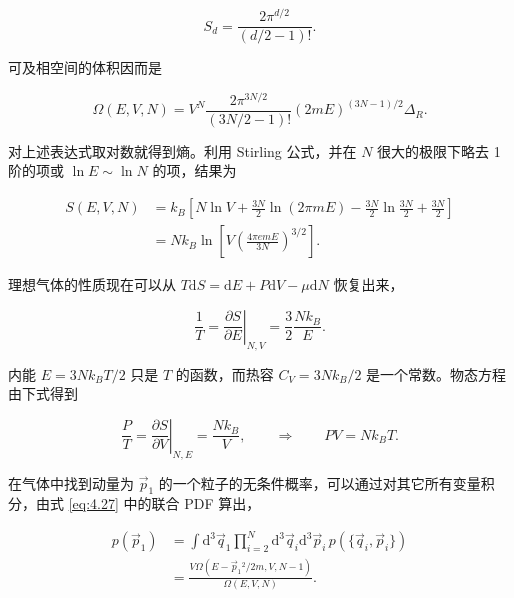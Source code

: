 \begin{equation}\label{eq:4.31}
  S_d=\frac{2\pi^{d/2}}{(d/2-1)!}.
\end{equation}

可及相空间的体积因而是

\begin{equation}\label{eq:4.32}
  \Omega(E,V,N)=V^N\frac{2\pi^{3N/2}}{(3N/2-1)!}(2mE)^{(3N-1)/2}\Delta_R.
\end{equation}

对上述表达式取对数就得到熵。利用 Stirling 公式，并在 $N$ 很大的极限下略去 1 阶的项或 $\ln E\sim\ln N$ 的项，结果为

\begin{equation}\label{eq:4.33}
  \begin{aligned}
    S(E,V,N)&=k_B\left[N\ln V+\frac{3N}{2}\ln(2\pi mE)-\frac{3N}{2}\ln\frac{3N}{2}+\frac{3N}{2}\right]\\
    &=Nk_B\ln\left[V\left(\frac{4\pi emE}{3N}\right)^{3/2}\right].
  \end{aligned}
\end{equation}

理想气体的性质现在可以从 $T\mathrm{d}S=\mathrm{d}E+P\mathrm{d}V-\mu\mathrm{d}N$ 恢复出来，

\begin{equation}\label{eq:4.34}
  \frac{1}{T}=\left.\frac{\partial S}{\partial E}\right|_{N,V}=\frac{3}{2}\frac{Nk_B}{E}.
\end{equation}

内能 $E=3Nk_BT/2$ 只是 $T$ 的函数，而热容 $C_V=3Nk_B/2$ 是一个常数。物态方程由下式得到

\begin{equation}\label{eq:4.35}
  \frac{P}{T}=\left.\frac{\partial S}{\partial V}\right|_{N,E}=\frac{Nk_B}{V},\qquad\Longrightarrow\qquad PV=Nk_BT.
\end{equation}

在气体中找到动量为 $\vec p_1$ 的一个粒子的无条件概率，可以通过对其它所有变量积分，由式 \eqref{eq:4.27} 中的联合 PDF 算出，

\begin{equation}\label{eq:4.36}
  \begin{aligned}
    p(\vec p_1)&=\int \mathrm{d}^3\vec q_1\prod_{i=2}^N\mathrm{d}^3\vec q_i\mathrm{d}^3\vec p_i\,p\left(\{\vec q_i,\vec p_i\}\right)\\
    &=\frac{V\Omega(E-\vec p_1{}^2/2m,V,N-1)}{\Omega(E,V,N)}.
  \end{aligned}
\end{equation}

